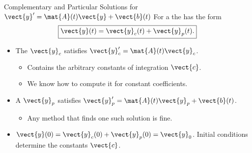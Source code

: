 \begin{frame}{Complementary and Particular Solutions for $\vect{y}'=\mat{A}(t)\vect{y}+\vect{b}(t)$}
For a  the  has the form
\[
  \boxed{\vect{y}(t)=\vect{y}_c(t)+\vect{y}_p(t).}
\]
\begin{itemize}
  \item The  $\vect{y}_c$ satisfies
  $\vect{y}_c'=\mat{A}(t)\vect{y}_c$.
  \begin{itemize}
    \item Contains the arbitrary constants of integration $\vect{c}$.
    \item We know how to compute it for constant coefficients.
  \end{itemize}
  \item A  $\vect{y}_p$ satisfies
  $\vect{y}_p'=\mat{A}(t)\vect{y}_p+\vect{b}(t)$.
  \begin{itemize}
    \item Any method that finds one such solution is fine.
  \end{itemize}
  \item $\vect{y}(0)=\vect{y}_c(0)+\vect{y}_p(0)=\vect{y}_0$.
  Initial conditions determine the constants $\vect{c}$.
\end{itemize}
\end{frame}
